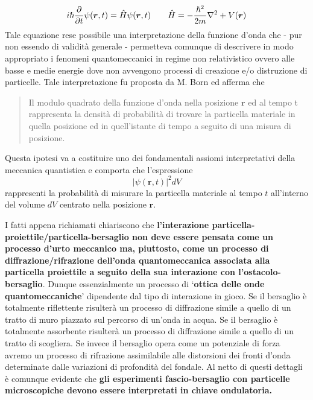 \begin{equation}
	i \hp \frac{\partial}{\partial t} \psi(\bm{r},t) = \hat{H}\psi(\bm{r},t) \qquad
	\hat{H} = - \frac{\hp^2}{2m} \nabla^2 + V(\bm{r})
	\label{eq:schroedinger}
\end{equation}
Tale equazione rese possibile una interpretazione della funzione d'onda
che - pur non essendo di validità generale - permetteva comunque di
descrivere in modo appropriato i fenomeni quantomeccanici in regime non
relativistico ovvero alle basse e medie energie dove non avvengono
processi di creazione e/o distruzione di particelle.
Tale interpretazione fu proposta da M. Born ed afferma che
\begin{quote}
	Il modulo quadrato della funzione d'onda nella posizione $ \bm{r}$ ed al
	tempo t rappresenta la densità di probabilità di trovare la particella
	materiale in quella posizione ed in quell'istante di tempo a seguito di
	una misura di posizione.
\end{quote}
Questa ipotesi va a costituire uno dei
fondamentali assiomi interpretativi della meccanica quantistica e
comporta che l'espressione
\begin{equation}
	\left | \psi(\bm{r},t)\right |^2 dV
	\label{eq:wave-probability-density}
\end{equation}
rappresenti la probabilità di misurare la particella
materiale al tempo \(t\) all'interno del volume \(dV\) centrato nella
posizione \(\bm{r}\).

I fatti appena richiamati chiariscono che \textbf{l'interazione
particella- proiettile/particella-bersaglio non deve essere pensata come
un processo d'urto meccanico ma, piuttosto, come un processo di
diffrazione/rifrazione dell'onda quantomeccanica associata alla
particella proiettile a seguito della sua interazione con
l'ostacolo-bersaglio}.
Dunque essenzialmente un processo di `\textbf{ottica delle onde quantomeccaniche}' dipendente dal tipo di
interazione in gioco.
Se il bersaglio è totalmente riflettente risulterà un processo di
diffrazione simile a quello di un tratto di muro piazzato sul percorso
di un'onda in acqua.
Se il bersaglio è totalmente assorbente risulterà
un processo di diffrazione simile a quello di un tratto di scogliera.
Se
invece il bersaglio opera come un potenziale di forza avremo un processo
di rifrazione assimilabile alle distorsioni dei fronti d'onda
determinate dalle variazioni di profondità del fondale.
Al netto di
questi dettagli è comunque evidente che \textbf{gli esperimenti
fascio-bersaglio con particelle microscopiche devono essere interpretati
in chiave ondulatoria.}

